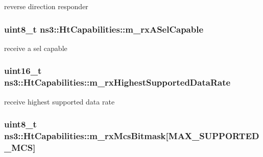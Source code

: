 reverse direction responder 

\subsubsection[{\texorpdfstring{m\+\_\+rx\+A\+Sel\+Capable}{m_rxASelCapable}}]{\setlength{\rightskip}{0pt plus 5cm}uint8\+\_\+t ns3\+::\+Ht\+Capabilities\+::m\+\_\+rx\+A\+Sel\+Capable\hspace{0.3cm}{\ttfamily [private]}}\hypertarget{classns3_1_1HtCapabilities_abb1269e0c1dc2ee42a53061e8b24cd1c}{}\label{classns3_1_1HtCapabilities_abb1269e0c1dc2ee42a53061e8b24cd1c}


receive a sel capable 

\subsubsection[{\texorpdfstring{m\+\_\+rx\+Highest\+Supported\+Data\+Rate}{m_rxHighestSupportedDataRate}}]{\setlength{\rightskip}{0pt plus 5cm}uint16\+\_\+t ns3\+::\+Ht\+Capabilities\+::m\+\_\+rx\+Highest\+Supported\+Data\+Rate\hspace{0.3cm}{\ttfamily [private]}}\hypertarget{classns3_1_1HtCapabilities_abcc5802e09b3001c75e4f25e34cfdec7}{}\label{classns3_1_1HtCapabilities_abcc5802e09b3001c75e4f25e34cfdec7}


receive highest supported data rate 

\subsubsection[{\texorpdfstring{m\+\_\+rx\+Mcs\+Bitmask}{m_rxMcsBitmask}}]{\setlength{\rightskip}{0pt plus 5cm}uint8\+\_\+t ns3\+::\+Ht\+Capabilities\+::m\+\_\+rx\+Mcs\+Bitmask\mbox{[}{\bf M\+A\+X\+\_\+\+S\+U\+P\+P\+O\+R\+T\+E\+D\+\_\+\+M\+CS}\mbox{]}\hspace{0.3cm}{\ttfamily [private]}}\hypertarget{classns3_1_1HtCapabilities_a737a933aa05ba9007781fa6b612782ab}{}\label{classns3_1_1HtCapabilities_a737a933aa05ba9007781fa6b612782ab}


